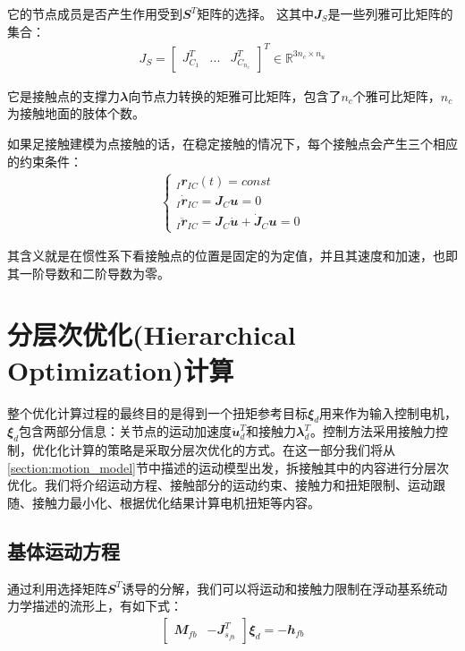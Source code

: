 它的节点成员是否产生作用受到${\mathbfit S}^T$矩阵的选择。
这其中${\mathbfit J}_S$是一些列雅可比矩阵的集合：
\begin{align}
    J_S=\begin{bmatrix}J^T_{C_1} & ... & J^T_{C_{n_c}}\end{bmatrix}^T  \in {\mathbb R}^{3n_c\times n_u}
\end{align}

它是接触点的支撑力${\mathbfit \lambda}$向节点力转换的矩雅可比矩阵，包含了$n_c$个雅可比矩阵，$n_c$为接触地面的肢体个数。

如果足接触建模为点接触的话，在稳定接触的情况下，每个接触点会产生三个相应的约束条件：
\begin{align}
    \label{eq:contact_constrains}
    \begin{cases}
        _I\mathbfit{r}_{IC}(t)=const\\
        _I \mathbfit{\dot r}_{IC}=\mathbfit{J}_C\mathbfit{u}=0\\
        _I\mathbfit{\ddot r}_{IC}=\mathbfit{J}_C \mathbfit{\dot u}+\mathbfit{\dot J}_C\mathbfit{u}=0
    \end{cases}
\end{align}

其含义就是在惯性系下看接触点的位置是固定的为定值，并且其速度和加速，也即其一阶导数和二阶导数为零。











\section[分层次优化(Hierarchical Optimization)计算]{\label{section:hierarchical_opt}分层次优化(Hierarchical Optimization)计算\cite[p2]{Bellicoso_Jenelten_Fankhauser_Gehring_Hwangbo_Hutter_2017}}

整个优化计算过程的最终目的是得到一个扭矩参考目标${\mathbfit \xi}_d$用来作为输入控制电机，${\mathbfit \xi}_d$包含两部分信息：关节点的运动加速度$\mathbfit{\dot u}_d^T$和接触力$\mathbfit{\lambda}_d^T$。控制方法采用接触力控制，优化化计算的策略是采取分层次优化的方式。在这一部分我们将从\ref{section:motion_model}节中描述的运动模型出发，拆接触其中的内容进行分层次优化。我们将介绍运动方程、接触部分的运动约束、接触力和扭矩限制、运动跟随、接触力最小化、根据优化结果计算电机扭矩等内容。

\subsection[基体运动方程]{基体运动方程}
通过利用选择矩阵$\mathbfit{S}^T$诱导的分解，我们可以将运动和接触力限制在浮动基系统动力学描述的流形上，有如下式：
\begin{align}
    \begin{bmatrix}{\mathbfit M}_{fb} & - {\mathbfit J}_{s_{fb}}^T \end{bmatrix} {\mathbfit \xi}_d = - {\mathbfit h}_{fb}
\end{align}

